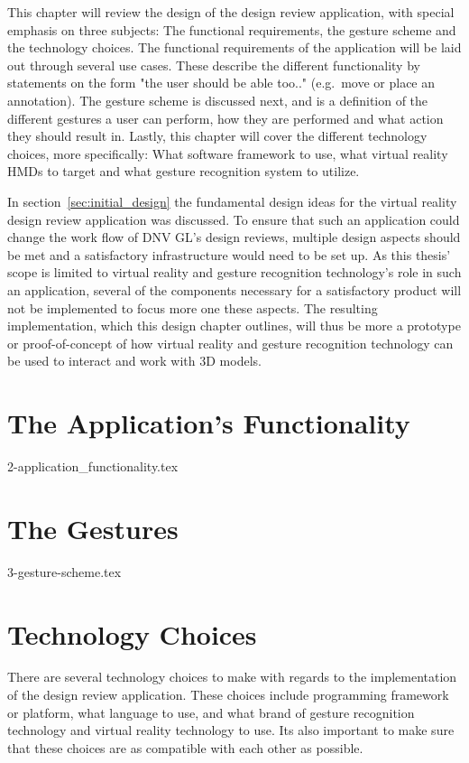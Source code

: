 This chapter will review the design of the design review application, with special emphasis on three subjects: The functional requirements, the gesture scheme and the technology choices.
The functional requirements of the application will be laid out through several use cases. These describe the different functionality by statements on the form
"the user should be able too.." (e.g.~move or place an annotation). The gesture scheme is discussed next, and is a definition of the different gestures
a user can perform, how they are performed and what action they should result in. Lastly, this chapter will cover the different technology choices, more specifically: What
software framework to use, what virtual reality HMDs to target and what gesture recognition system to utilize. 

In section~\vref{sec:initial_design} the fundamental design ideas for the virtual reality design review application was discussed. 
To ensure that such an application could change the work flow of DNV GL's design reviews, multiple design aspects should be met and a satisfactory infrastructure would need to be
set up. As this thesis' scope is limited to virtual reality and gesture recognition technology's role in such an application, several of the components necessary for
a satisfactory product will not be implemented to focus more one these aspects. The resulting implementation, which this design chapter outlines, will thus be more
a prototype or proof-of-concept of how virtual reality and gesture recognition technology can be used to interact and work with 3D models. 

\section{The Application's Functionality}
\label{sec:application_functionality}
{2-application_functionality.tex}

\section{The Gestures}
\label{sec:gesture_design}
{3-gesture-scheme.tex}

\section{Technology Choices}
\label{sec:design_choices}
There are several technology choices to make with regards to the implementation of the design review application.
These choices include programming framework or platform, what language to use, and what brand of gesture recognition technology and
virtual reality technology to use. Its also important to make sure that these choices are as compatible with each other as possible.

